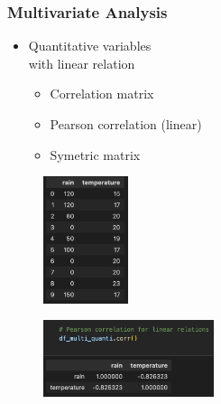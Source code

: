 \begin{frame}\frametitle{Multivariate Analysis}
   \begin{minipage}{0.48\linewidth}
      \begin{itemize}
         \item Quantitative variables\\
               with linear relation
         \begin{itemize}
            \item Correlation matrix
            \item Pearson correlation (linear)
            \item Symetric matrix
         \end{itemize}
      \end{itemize}
      \vspace{.5cm}
      \begin{figure}[H]
         \includegraphics[width=2.5cm]{../images/illustrations/pattern_multivariate_quantitative_df.png}
      \end{figure}
   \end{minipage}
   \begin{minipage}{0.48\linewidth}
      \begin{figure}[H]
         \includegraphics[width=5cm]{../images/illustrations/pattern_multivariate_quantitative_corr.png}
      \end{figure}
   \end{minipage}
\end{frame}


